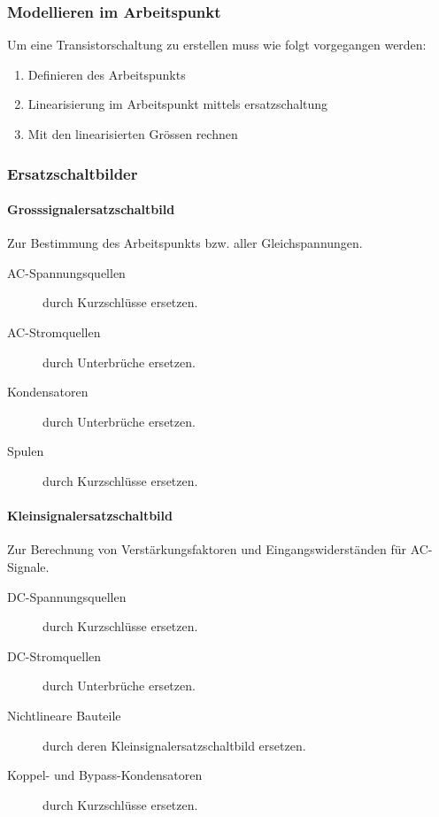 \subsubsection{Modellieren im Arbeitspunkt}
Um eine Transistorschaltung zu erstellen muss wie folgt vorgegangen werden:
\begin{enumerate}
    \item Definieren des Arbeitspunkts
    \item Linearisierung im Arbeitspunkt mittels ersatzschaltung
    \item Mit den linearisierten Grössen rechnen
\end{enumerate}

\subsubsection{Ersatzschaltbilder}
\paragraph{Grosssignalersatzschaltbild}
Zur Bestimmung des Arbeitspunkts bzw. aller Gleichspannungen.
\begin{description}
    \item[AC-Spannungsquellen] durch Kurzschlüsse ersetzen.
    \item[AC-Stromquellen] durch Unterbrüche ersetzen. 
    \item[Kondensatoren] durch Unterbrüche ersetzen.
    \item[Spulen] durch Kurzschlüsse ersetzen.  
\end{description}

\paragraph{Kleinsignalersatzschaltbild}
Zur Berechnung von Verstärkungsfaktoren und Eingangswiderständen für AC-Signale.
\begin{description}
    \item[DC-Spannungsquellen] durch Kurzschlüsse ersetzen.
    \item[DC-Stromquellen] durch Unterbrüche ersetzen. 
    \item[Nichtlineare Bauteile] durch deren Kleinsignalersatzschaltbild ersetzen.
    \item[Koppel- und Bypass-Kondensatoren] durch Kurzschlüsse ersetzen.  
\end{description}